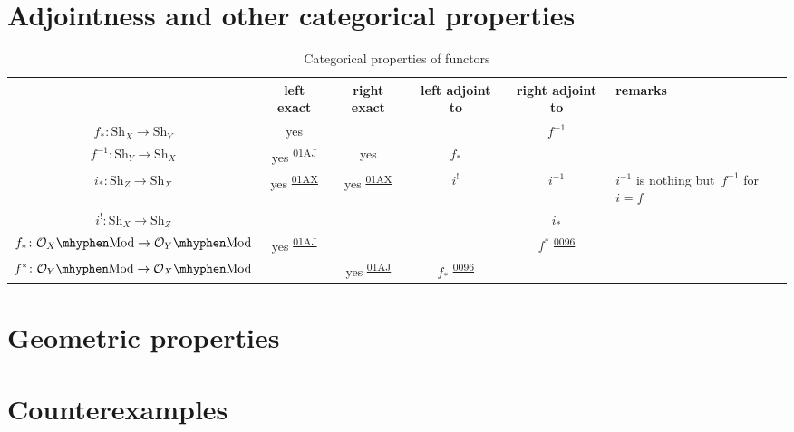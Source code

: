 \documentclass[a4paper,10pt]{article}
\theoremstyle{definition}
\newcommand\stackstagshort[1]{\href{http://stacks.math.columbia.edu/tag/#1}{#1}}
\newcommand\stackscite[1]{\textsuperscript{\stackstagshort{#1}}}
\newcommand\Sh{\ensuremath{\mathrm{Sh}}}
\begin{document}
\section{Adjointness and other categorical properties}
\label{section:categorical-properties}
\begin{sidewaystable}[p]
  \centering
  \small
  \renewcommand*\arraystretch{1.5}
  \begin{tabular}{cccccl}
    \toprule
    & left exact & right exact & left adjoint to & right adjoint to & remarks \\\midrule
    $f_*\colon\Sh_X\to\Sh_Y$ & yes & & & $f^{-1}$ \\
    $f^{-1}\colon\Sh_Y\to\Sh_X$ & yes \stackscite{01AJ} & yes & $f_*$ \\
    $i_*\colon\Sh_Z\to\Sh_X$ & yes \stackscite{01AX} & yes \stackscite{01AX} & $i^!$ & $i^{-1}$ & $i^{-1}$ is nothing but~$f^{-1}$ for~$i=f$ \\
    $i^!\colon\Sh_X\to\Sh_Z$ & & & & $i_*$ \\
    $f_*\colon\Mod{\mathcal{O}_X}\to\Mod{\mathcal{O}_Y}$ & yes \stackscite{01AJ} & & & $f^*$ \stackscite{0096} \\
    $f^*\colon\Mod{\mathcal{O}_Y}\to\Mod{\mathcal{O}_X}$ & & yes \stackscite{01AJ} & $f_*$ \stackscite{0096} & \\
    \bottomrule
  \end{tabular}
  \caption{Categorical properties of functors}
  \label{table:categorical-properties}
\end{sidewaystable}

\section{Geometric properties}
\label{section:geometric-properties}

\section{Counterexamples}
\label{section:counterexamples}

\nocite{*}
\printbibliography
\end{document}
